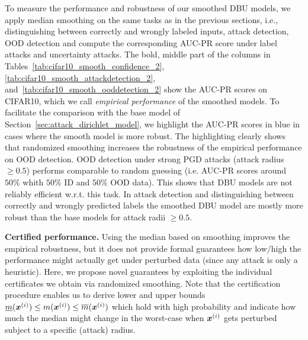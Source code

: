 To measure the performance and robustness of our smoothed DBU models, we apply median smoothing on the same tasks as in the previous sections, i.e., distinguishing between correctly and wrongly labeled inputs, attack detection, OOD detection and compute the corresponding AUC-PR score under label attacks and uncertainty attacks. 
The bold, middle part of the columns in Tables~\ref{tab:cifar10_smooth_confidence_2}, \ref{tab:cifar10_smooth_attackdetection_2}, and~\ref{tab:cifar10_smooth_ooddetection_2} show the AUC-PR scores on CIFAR10, which we call \emph{empirical performance} of the smoothed models. To facilitate the comparison with the base model of Section~\ref{sec:attack_dirichlet_model}, we highlight the AUC-PR scores in blue in cases where the smooth model is more robust. The highlighting clearly shows that randomized smoothing increases the robustness of the empirical performance on OOD detection. 
OOD detection under strong PGD attacks (attack radius $\geq 0.5$) performs comparable to random guessing (i.e. AUC-PR scores around $50\%$ whith $50\%$ ID and $50\%$ OOD data). This shows that DBU models are not reliably efficient w.r.t. this task.
In attack detection and distinguishing between correctly and wrongly predicted labels the smoothed DBU model are mostly more robust than the base models for attack radii $\geq 0.5$.

\textbf{Certified performance.} Using the median based on smoothing improves the empirical robustness, but it does not provide formal guarantees how low/high the performance might actually get under perturbed data (since any attack is only a heuristic). 
Here, we propose novel guarantees by exploiting the individual certificates we obtain via randomized smoothing.
 Note that the certification procedure \citep{median_smoothing} enables us to derive lower and upper bounds $\underline{m}({\bm{x}}^{(i)}) \leq m({\bm{x}}^{(i)}) \leq \overline{m}({\bm{x}}^{(i)})$ which hold with high probability and indicate how much the median might change in the worst-case when ${\bm{x}}^{(i)}$ gets perturbed subject to a specific (attack) radius.
 
